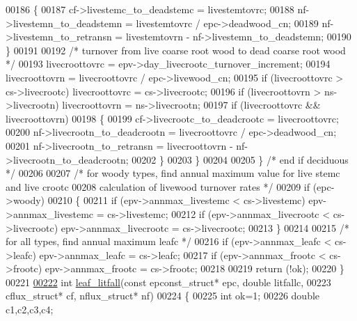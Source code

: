 \begin{DoxyCode}
00186             \{
00187                 cf->livestemc\_to\_deadstemc = livestemtovrc;
00188                 nf->livestemn\_to\_deadstemn = livestemtovrc / epc->deadwood\_cn;
00189                 nf->livestemn\_to\_retransn = livestemtovrn - nf->livestemn\_to\_deadstemn;
00190             \}
00191 
00192             \textcolor{comment}{/* turnover from live coarse root wood to dead coarse root wood */}
00193             livecroottovrc = epv->day\_livecrootc\_turnover\_increment;
00194             livecroottovrn = livecroottovrc / epc->livewood\_cn;
00195             \textcolor{keywordflow}{if} (livecroottovrc > cs->livecrootc) livecroottovrc = cs->livecrootc;
00196             \textcolor{keywordflow}{if} (livecroottovrn > ns->livecrootn) livecroottovrn = ns->livecrootn;
00197             \textcolor{keywordflow}{if} (livecroottovrc && livecroottovrn)
00198             \{
00199                 cf->livecrootc\_to\_deadcrootc = livecroottovrc;
00200                 nf->livecrootn\_to\_deadcrootn = livecroottovrc / epc->deadwood\_cn;
00201                 nf->livecrootn\_to\_retransn = livecroottovrn - nf->livecrootn\_to\_deadcrootn;
00202             \}
00203         \}
00204         
00205     \} \textcolor{comment}{/* end if deciduous */}
00206     
00207     \textcolor{comment}{/* for woody types, find annual maximum value for live stemc and live crootc}
00208 \textcolor{comment}{    calculation of livewood turnover rates */}
00209     \textcolor{keywordflow}{if} (epc->woody)
00210     \{
00211         \textcolor{keywordflow}{if} (epv->annmax\_livestemc < cs->livestemc) epv->annmax\_livestemc = cs->livestemc;
00212         \textcolor{keywordflow}{if} (epv->annmax\_livecrootc < cs->livecrootc) epv->annmax\_livecrootc = cs->livecrootc;
00213     \}   
00214     
00215     \textcolor{comment}{/* for all types, find annual maximum leafc */}
00216     \textcolor{keywordflow}{if} (epv->annmax\_leafc < cs->leafc) epv->annmax\_leafc = cs->leafc;
00217     \textcolor{keywordflow}{if} (epv->annmax\_frootc < cs->frootc) epv->annmax\_frootc = cs->frootc;
00218     
00219     \textcolor{keywordflow}{return} (!ok);
00220 \}
00221 
\hypertarget{phenology_8c_source_l00222}{}\hyperlink{phenology_8c_a6400c77226b2dd734e44323a5a2c9d64}{00222} \textcolor{keywordtype}{int} \hyperlink{phenology_8c_a6400c77226b2dd734e44323a5a2c9d64}{leaf\_litfall}(\textcolor{keyword}{const} epconst\_struct* epc, \textcolor{keywordtype}{double} litfallc,
00223 cflux\_struct* cf, nflux\_struct* nf)
00224 \{
00225     \textcolor{keywordtype}{int} ok=1;
00226     \textcolor{keywordtype}{double} c1,c2,c3,c4;

\end{DoxyCode}
